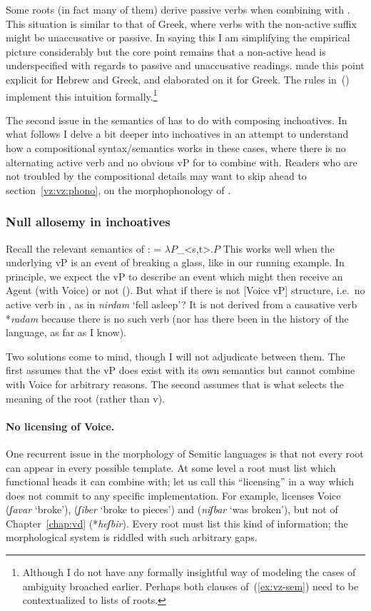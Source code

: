 Some roots (in fact many of them) derive passive verbs when combining with {\tnif}. This situation is similar to that of Greek, where verbs with the non-active suffix might be unaccusative or passive. In saying this I am simplifying the empirical picture considerably but the core point remains that a non-active head is underspecified with regards to passive and unaccusative readings. \cite{alexiadoudoron12} made this point explicit for Hebrew and Greek, and \cite{layering15} elaborated on it for Greek. The rules in~(\lastx) implement this intuition formally.\footnote{Although I do not have any formally insightful way of modeling the cases of ambiguity broached earlier. Perhaps both clauses of~(\ref{ex:vz-sem}) need to be contextualized to lists of roots.}

The second issue in the semantics of {\vz} has to do with composing inchoatives. In what follows I delve a bit deeper into inchoatives in an attempt to understand how a compositional syntax/semantics works in these cases, where there is no alternating active verb and no obvious vP for {\vz} to combine with. Readers who are not troubled by the compositional details may want to skip ahead to section~\ref{vz:vz:phono}, on the morphophonology of {\vz}.

  		\subsubsection{Null allosemy in inchoatives} \label{vz:inch:analysis}
Recall the relevant semantics of {\vz}:
\ex \denote{\vz} = $\lambda P$_{<s,t>}$.P$
\xe
This works well when the underlying vP is an event of breaking a glass, like in our running example. In principle, we expect the vP to describe an event which might then receive an Agent (with Voice) or not ({\vz}). But what if there is not [Voice vP] structure, i.e.~no active verb in {\tkal}, as in \emph{nirdam} `fell asleep'? It is not derived from a causative verb *\emph{radam} because there is no such verb (nor has there been in the history of the language, as far as I know).

Two solutions come to mind, though I will not adjudicate between them. The first assumes that the vP does exist with its own semantics but cannot combine with Voice for arbitrary reasons. The second assumes that {\vz} is what selects the meaning of the root (rather than v).

\paragraph{No licensing of Voice.} One recurrent issue in the morphology of Semitic languages is that not every root can appear in every possible template. At some level a root must list which functional heads it can combine with; let us call this ``licensing'' in a way which does not commit to any specific implementation. For example,  licenses Voice (\emph{ʃavar} `broke'), {\va} (\emph{ʃiber} `broke to pieces') and {\vz} (\emph{niʃbar} `was broken'), but not {\vd} of Chapter~\ref{chap:vd} (*\emph{heʃbir}). Every root must list this kind of information; the morphological system is riddled with such arbitrary gaps.

